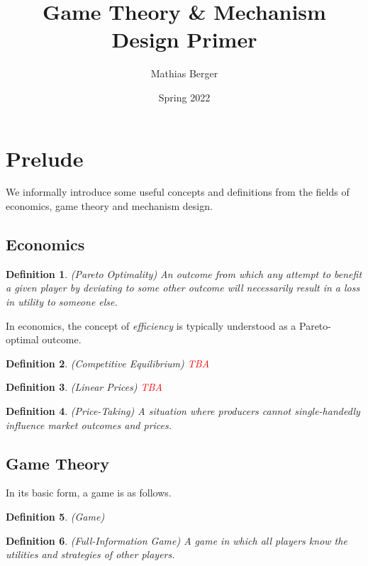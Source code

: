 \documentclass{article}
\title{Game Theory \& Mechanism Design Primer}
\author{Mathias Berger}
\date{Spring 2022}
\newtheorem{definition}{Definition}
\begin{document}
\maketitle

\section{Prelude}

We informally introduce some useful concepts and definitions from the fields of economics, game theory and mechanism design.

\subsection{Economics}

\begin{definition}
(Pareto Optimality) An outcome from which any attempt to benefit a given player by deviating to some other outcome will necessarily result in a loss in utility to someone else.
\end{definition}

In economics, the concept of \textit{efficiency} is typically understood as a Pareto-optimal outcome.

\begin{definition}
(Competitive Equilibrium) \textcolor{red}{TBA}
\end{definition}

\begin{definition}
(Linear Prices) \textcolor{red}{TBA}
\end{definition}

\begin{definition}
(Price-Taking) A situation where producers cannot single-handedly influence market outcomes and prices.
\end{definition}  

\subsection{Game Theory}

In its basic form, a game is as follows.

\begin{definition}
(Game)
\end{definition}

\begin{definition}
(Full-Information Game) A game in which all players know the utilities and strategies of other players.
\end{definition}
\end{document}
